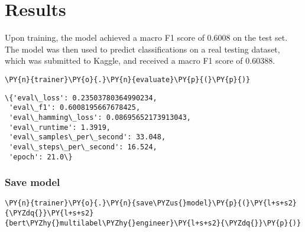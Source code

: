 \documentclass[../main.tex]{subfiles}
\begin{document}
\chapter{Results}

Upon training, the model achieved a macro F1 score of 0.6008 on the test set. 
The model was then used to predict classifications on a real testing dataset, 
which was submitted to Kaggle, and received a macro F1 score of 0.60388.
\vspace{0.2in}


    \begin{tcolorbox}[breakable, size=fbox, boxrule=1pt, pad at break*=1mm,colback=cellbackground, colframe=cellborder]
\begin{Verbatim}[commandchars=\\\{\}]
\PY{n}{trainer}\PY{o}{.}\PY{n}{evaluate}\PY{p}{(}\PY{p}{)}
\end{Verbatim}
\end{tcolorbox}

    
            \begin{tcolorbox}[breakable, size=fbox, boxrule=.5pt, pad at break*=1mm, opacityfill=0]
\begin{Verbatim}[commandchars=\\\{\}]
\{'eval\_loss': 0.23503780364990234,
 'eval\_f1': 0.6008195667678425,
 'eval\_hamming\_loss': 0.08695652173913043,
 'eval\_runtime': 1.3919,
 'eval\_samples\_per\_second': 33.048,
 'eval\_steps\_per\_second': 16.524,
 'epoch': 21.0\}
\end{Verbatim}
\end{tcolorbox}
        
    \subsection{Save model}\label{save-model}

    \begin{tcolorbox}[breakable, size=fbox, boxrule=1pt, pad at break*=1mm,colback=cellbackground, colframe=cellborder]
\begin{Verbatim}[commandchars=\\\{\}]
\PY{n}{trainer}\PY{o}{.}\PY{n}{save\PYZus{}model}\PY{p}{(}\PY{l+s+s2}{\PYZdq{}}\PY{l+s+s2}{bert\PYZhy{}multilabel\PYZhy{}engineer}\PY{l+s+s2}{\PYZdq{}}\PY{p}{)}
\end{Verbatim}
\end{tcolorbox}
\end{document}
